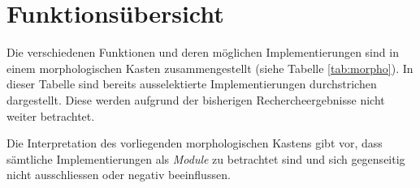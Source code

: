 \section{Funktionsübersicht}
Die verschiedenen Funktionen und deren möglichen Implementierungen sind in
einem morphologischen Kasten zusammengestellt (siehe Tabelle 
\ref{tab:morpho}). In dieser Tabelle sind bereits ausselektierte 
Implementierungen durchstrichen dargestellt. Diese werden aufgrund der
bisherigen Rechercheergebnisse nicht weiter betrachtet.

Die Interpretation des vorliegenden morphologischen Kastens gibt vor, dass
sämtliche Implementierungen als \emph{Module} zu betrachtet sind und sich
gegenseitig nicht ausschliessen oder negativ beeinflussen.




















